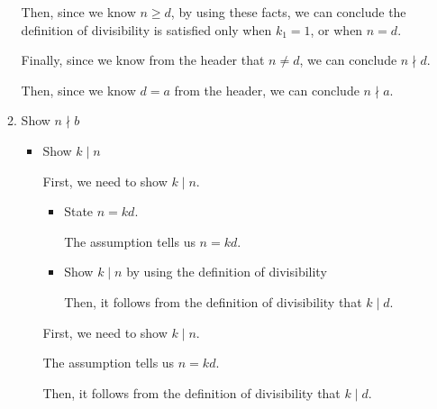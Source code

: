 \documentclass[12pt]{article}
\begin{document}
\begin{enumerate}[a.]
\begin{mdframed}
\begin{enumerate}[1.]
\begin{mdframed}
        Then, since we know $n \geq d$, by using these facts, we can conclude
        the definition of divisibility is satisfied only when $k_1 = 1$, or
        when $n = d$.

        \bigskip

        Finally, since we know from the header that $n \neq d$, we can conclude
        $n \nmid d$.

        \bigskip

        Then, since we know $d = a$ from the header, we can conclude $n \nmid a$.

        \end{mdframed}

        \item Show $n \nmid b$
        \begin{itemize}

            \item Show $k \mid n$

            \bigskip

            First, we need to show $k \mid n$.

            \bigskip

            \begin{itemize}
                \item State $n = kd$.
                \begin{mdframed}
                The assumption tells us $n = kd$.
                \end{mdframed}

                \item Show $k \mid n$ by using the definition of divisibility
                \begin{mdframed}
                Then, it follows from the definition of divisibility that $k \mid d$.
                \end{mdframed}
            \end{itemize}

            \bigskip

            \begin{mdframed}

            First, we need to show $k \mid n$.

            \bigskip

            The assumption tells us $n = kd$.

            \bigskip

            Then, it follows from the definition of divisibility that $k \mid d$.
            \end{mdframed}


\end{itemize}
\end{enumerate}
\end{mdframed}
\end{enumerate}
\end{document}
